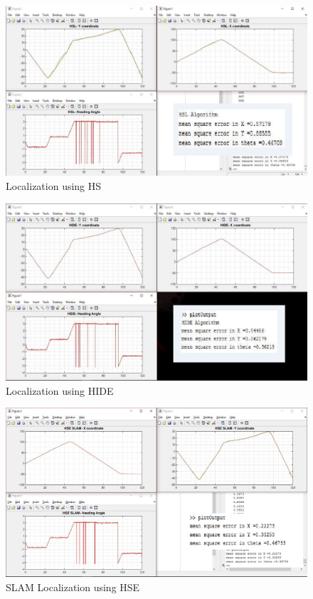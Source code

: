 \documentclass[letterpaper, 10 pt, conference]{ieeeconf}  %
\begin{document}
\begin{figure}[H]
  \includegraphics[width=\linewidth]{lhs.png}
  \caption{Localization using HS}
  \label{fig:dataset}
\end{figure}

\begin{figure}[H]
  \includegraphics[width=\linewidth]{lhide.png}
  \caption{Localization using HIDE}
  \label{fig:dataset}
\end{figure}

\begin{figure}[H]
  \includegraphics[width=\linewidth]{slam1.jpg}
  \caption{SLAM Localization using HSE}
  \label{fig:dataset}
\end{figure}
\end{document}
